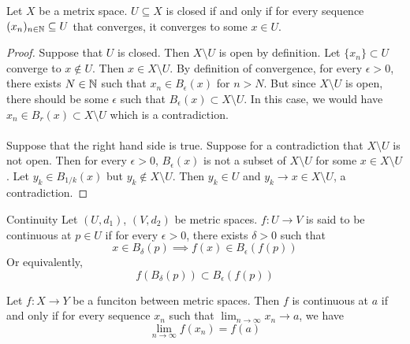 \documentclass[a4paper]{article}
\begin{document}
\begin{prp}{}{} Let $X$ be a metrix space. $U\subseteq X$ is closed if and only if for every sequence $(x_n)_{n\in\mathbb{N}}\subseteq U$ that converges, it converges to some $x\in U$. \tcbline
\begin{proof} Suppose that $U$ is closed. Then $X\setminus U$ is open by definition. Let $\{x_n\}\subset U$ converge to $x\notin U$. Then $x\in X\setminus U$. By definition of convergence, for every $\epsilon>0$, there exists $N\in\mathbb{N}$ such that $x_n\in B_\epsilon(x)$ for $n>N$. But since $X\setminus U$ is open, there should be some $\epsilon$ such that $B_\epsilon(x)\subset X\setminus U$. In this case, we would have $x_n\in B_r(x)\subset X\setminus U$ which is a contradiction. \\~\\
Suppose that the right hand side is true. Suppose for a contradiction that $X\setminus U$ is not open. Then for every $\epsilon>0$, $B_\epsilon(x)$ is not a subset of $X\setminus U$ for some $x\in X\setminus U$. Let $y_k\in B_{1/k}(x)$ but $y_k\notin X\setminus U$. Then $y_k\in U$ and $y_k\to x\in X\setminus U$, a contradiction. 
\end{proof}
\end{prp}

\begin{defn}{Continuity}{} Let $(U,d_1)$, $(V,d_2)$ be metric spaces. $f:U\to V$ is said to be continuous at $p\in U$ if for every $\epsilon>0$, there exists $\delta>0$ such that $$x\in B_{\delta}(p)\implies f(x)\in B_{\epsilon}(f(p))$$ Or equivalently, $$f(B_{\delta}(p))\subset B_{\epsilon}(f(p))$$
\end{defn}

\begin{prp}{}{} Let $f:X\to Y$ be a funciton between metric spaces. Then $f$ is continuous at $a$ if and only if for every sequence $x_n$ such that $\lim_{n\to\infty}x_n\to a$, we have $$\lim_{n\to\infty}f(x_n)=f(a)$$
\end{prp}
\end{document}
